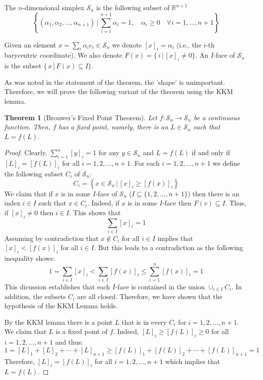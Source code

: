 \documentclass[12pt]{article}
\newtheorem{theorem}{Theorem}
\begin{document}
The $n$-dimensional simplex $\mathcal{S}_n$ is the following
subset of $\mathbb{R}^{n+1}$
\[
\left\{(\alpha_1,\alpha_2,\ldots,\alpha_{n+1}) \, \Big| \,
\sum_{i=1}^{n+1}\alpha_i=1, \quad \alpha_i\geq0 \quad \forall
i=1,\ldots,n+1\right\}
\]

Given an element $x=\sum_i\alpha_i e_i\in\mathcal{S}_n$ we denote
$[x]_i=\alpha_i$ (i.e., the $i$-th barycentric coordinate). We
also denote $F(x)=\{\, i\, |\, [x]_i \neq 0\}$. An $I$-face of
$\mathcal{S}_n$ is the subset $\{\, x\, |\, F(x)\subseteq I \}$.

As was noted in the statement of the theorem, the 'shape' is
unimportant. Therefore, we will prove the
following variant of the theorem using the KKM lemma.

\begin{theorem}[Brouwer's Fixed Point Theorem]
Let $f:\mathcal{S}_n\to\mathcal{S}_n$ be a continuous function.
Then, $f$ has a fixed point, namely, there is an
$L\in\mathcal{S}_n$ such that $L=f(L)$.
\end{theorem}
\begin{proof}
Clearly, $\sum_{i=1}^n [y]_i = 1$ for any $y\in\mathcal{S}_n$ and
$L=f(L)$ if and only if $[L]_i = [f(L)]_i$ for all
$i=1,2,\ldots,n+1$. For each $i=1,2,\ldots, n+1$ we define the
following subset $C_i$ of $\mathcal{S}_n$:
\[
C_i = \left\{x\in\mathcal{S}_n \,\Big|\, [x]_i\geq[f(x)]_i\right\}
\]
We claim that if $x$ is in some $I$-face of $\mathcal{S}_n$
($I\subseteq\{1,2,\ldots,n+1\}$) then there is an index $i\in I$
such that $x \in C_i$. Indeed, if $x$ is in some $I$-face then
$F(v) \subseteq I$. Thus, if $[x]_i \neq 0$ then $i\in I$. This
shows that
\[
\sum_{i\in I} [x]_i = 1
\]
Assuming by contradiction that $x\not\in C_i$ for all $i\in I$
implies that $[x]_i < [f(x)]_i$ for all $i\in I$. But this leads
to a contradiction as the following inequality shows:
\[
1 = \sum_{i\in I} [x]_i < \sum_{i\in I} [f(x)]_i \leq \sum_{i=1}^n
[f(x)]_i = 1
\]
This dicussion establishes that each $I$-face is contained in the
union $\cup_{i\in I} C_i$. In addition, the subsets $C_i$ are all
closed. Therefore, we have shown that the hypothesis of the KKM
Lemma holds.

By the KKM lemma there is a point $L$ that is in every $C_i$ for
$i=1,2,\ldots,n+1$. We claim that $L$ is a fixed point of $f$.
Indeed, $[L]_i\geq[f(L)]_i\geq0$ for all $i=1,2,\ldots,n+1$ and
thus:
\[
1 = [L]_1 + [L]_2 + \cdots + [L]_{n+1} \geq [f(L)]_1 + [f(L)]_2 +
\cdots + [f(L)]_{n+1} = 1
\]
Therefore, $[L]_i=[f(L)]_i$ for all $i=1,2,\ldots,n+1$ which
implies that $L=f(L)$.
\end{proof}

\end{document}
